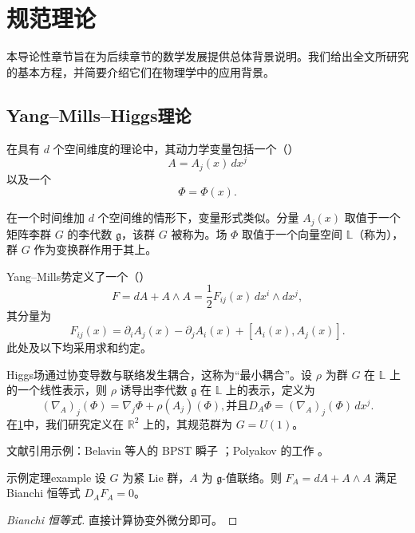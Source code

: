 \chapter{规范理论}\label{chap:1}
\begin{refsection}
本导论性章节旨在为后续章节的数学发展提供总体背景说明。我们给出全文所研究的基本方程，并简要介绍它们在物理学中的应用背景。

\section{Yang--Mills--Higgs理论}\label{sec:ymh}

在具有 $d$ 个空间维度的理论中，其动力学变量包括一个（）
\[
A = A_j(x)\,dx^j
\]
以及一个
\[
\Phi = \Phi(x) .
\]

在一个时间维加 $d$ 个空间维的情形下，变量形式类似。分量 $A_j(x)$ 取值于一个矩阵李群 $G$ 的李代数 $\mathfrak{g}$，该群 $G$ 被称为。场 $\Phi$ 取值于一个向量空间 $\mathbb{L}$（称为），群 $G$ 作为变换群作用于其上。

Yang--Mills势定义了一个（）
\begin{equation}\label{eq:1.1.1}
F = dA + A\wedge A = \frac12 F_{ij}(x)\,dx^i\wedge dx^j ,
\end{equation}
其分量为
\begin{equation}\label{eq:1.1.2}
F_{ij}(x)
 = \partial_i A_j(x) - \partial_j A_i(x)
   + [A_i(x),A_j(x)] .
\end{equation}
此处及以下均采用求和约定。

Higgs场通过协变导数与联络发生耦合，这称为“最小耦合”。设 $\rho$ 为群 $G$ 在 $\mathbb{L}$ 上的一个线性表示，则 $\rho$ 诱导出李代数 $\mathfrak{g}$ 在 $\mathbb{L}$ 上的表示，定义为
\begin{subequations}
  \begin{equation}\label{eq:1.1.3a}
    (\nabla_{A})_j(\Phi) = \nabla_j\Phi + \rho(A_j)(\Phi),
  \end{equation}
  并且
  \begin{equation}\label{eq:1.1.3b}
    D_A\Phi = (\nabla_A)_j(\Phi)\,dx^j .
  \end{equation}
\end{subequations}
在\cref{chap:1}中，我们研究定义在 $\mathbb{R}^2$ 上的，其规范群为 $G=U(1)$。
\begin{rmk}
文献引用示例：Belavin 等人的 BPST 瞬子 \cite{belavin1975}；Polyakov 的工作 \cite{polyakov1974,polyakov1977}。
\end{rmk}

\begin{thm}{示例定理}{example}
设 $G$ 为紧 Lie 群，$A$ 为 $\mathfrak{g}$-值联络。则 $F_A = dA + A \wedge A$ 满足 Bianchi 恒等式 $D_A F_A = 0$。
\end{thm}

\begin{proof}[Bianchi 恒等式]
直接计算协变外微分即可。
\end{proof}

\printbibliography[heading=subbibliography,title=本章参考文献]
\end{refsection}

